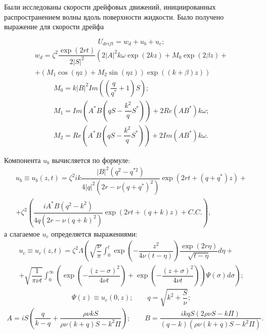 Были исследованы скорости дрейфовых движений, инициированных распространением волны вдоль поверхности жидкости. Было получено выражение для скорости дрейфа

\begin{equation}
U_{drift}=w_{d}+u_{b}+u_{c};
\label{UdriftPAV}
\end{equation}
\vspace{-15pt}
\begin{multline}
w_{d}= \zeta^{2} \dfrac{\exp \left( 2 r t \right)}{2 \vert S \vert^{2}}\left( 2 \vert A \vert^{2} k \omega \exp \left( 2 k z \right)+ M_{0} \exp \left( 2 \beta z \right) +\right.\\
\left.+\left( M_{1}\cos \left( \eta z \right) +M_{2} \sin \left( \eta z \right) \right) \exp \left( \left( k+\beta \right) z \right) \right)
\label{wdPAV}
\end{multline}
\noindent
\begin{gather*}
M_{0}= k \vert B \vert^{2} Im \left( \left( \dfrac{q}{q^{*}}+1 \right) S \right);\\
M_{1}=Im \left( A^{*} B \left( q S - \dfrac{k^{2}}{q}S^{*} \right) \right)+2 Re \left( A B^{*} \right) k \omega;\\
M_{2}=Re\left( A^{*} B \left( q S - \dfrac{k^{2}}{q}S^{*} \right) \right) + 2 Im \left( A B^{*} \right) k \omega.
\end{gather*}

Компонента $ u_{b} $ вычисляется по  формуле:
\begin{multline}
u_{b} \equiv u_{b} \left( z, t \right) = \zeta^{2}  i k \dfrac{\vert B \vert^{2} \left( q^{2}-q^{*2}\right)}{4 \vert q \vert^{2} \left( 2 r-\nu \left( q + q^{*} \right)^{2}\right)} \exp \left( 2 r t+ \left( q+q^{*}\right) z \right)+ \\
+\zeta^{2} \left( \dfrac{i A^{*} B \left( q^{2} - k^{2} \right)}{4 q \left( 2 r - \nu \left( q+k \right)^{2} \right)} \exp \left( 2 r t +\left( q+k\right) z \right) +C.C. \right),
\label{Ub}
\end{multline}
а слагаемое $ u_{c} $ определяется выражениями:
\begin{multline}
u_{c} \equiv u_{c} \left( z, t \right) = \zeta^{2} \Lambda \left( \sqrt{\dfrac{\nu}{\pi}} \int_{0}^{t} \exp \left( - \dfrac{z^{2}}{4 \nu \left( t - \eta \right)} \right) \dfrac{\exp \left( 2 r \eta \right)}{\sqrt{t - \eta}}d \eta +\right.\\
\left. + \sqrt{\dfrac{1}{\pi \nu t}} \int_{0}^{\infty} \left( \exp \left( -\dfrac{\left( z - \sigma \right)^{2}}{4 \nu t} \right) + \exp \left( -\dfrac{\left( z + \sigma \right)^{2}}{4 \nu t} \right) \right) \Psi \left( \sigma \right) d \sigma\right);
\label{UcYavVid}
\end{multline}
\begin{equation*}
\Psi \left( z \right) \equiv u_{c}\left( 0, z \right); \qquad q=\sqrt{k^{2}+\dfrac{S}{\nu}};
\end{equation*}
\begin{gather*}
A=i S \left( \dfrac{q}{k - q} + \dfrac{\rho \nu k S}{\rho \nu \left( k+q \right) S - k^{2} \Pi}\right); \qquad B=\dfrac{i k q S \left( 2\rho \nu S - k \Pi \right)}{\left( q-k \right) \left( \rho \nu \left( k+q \right) S - k^{2} \Pi \right)}.
\end{gather*}

